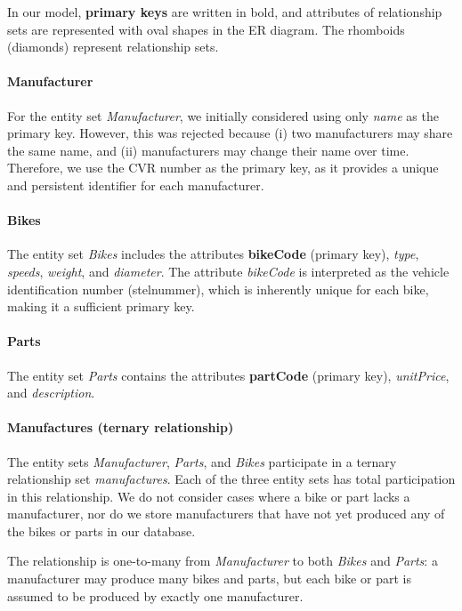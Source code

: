 \documentclass[dtu]{dtuarticle}
\begin{document}
In our model, \textbf{primary keys} are written in bold, and attributes of relationship sets are represented with oval shapes in the ER diagram. The rhomboids (diamonds) represent relationship sets.

\paragraph{Manufacturer}
For the entity set \textit{Manufacturer}, we initially considered using only \textit{name} as the primary key. However, this was rejected because (i) two manufacturers may share the same name, and (ii) manufacturers may change their name over time. Therefore, we use the CVR number as the primary key, as it provides a unique and persistent identifier for each manufacturer.

\paragraph{Bikes}
The entity set \textit{Bikes} includes the attributes \textbf{bikeCode} (primary key), \textit{type}, \textit{speeds}, \textit{weight}, and \textit{diameter}. The attribute \textit{bikeCode} is interpreted as the vehicle identification number (stelnummer), which is inherently unique for each bike, making it a sufficient primary key.

\paragraph{Parts}
The entity set \textit{Parts} contains the attributes \textbf{partCode} (primary key), \textit{unitPrice}, and \textit{description}.

\paragraph{Manufactures (ternary relationship)}
The entity sets \textit{Manufacturer}, \textit{Parts}, and \textit{Bikes} participate in a ternary relationship set \textit{manufactures}. Each of the three entity sets has total participation in this relationship. We do not consider cases where a bike or part lacks a manufacturer, nor do we store manufacturers that have not yet produced any of the bikes or parts in our database.

The relationship is one-to-many from \textit{Manufacturer} to both \textit{Bikes} and \textit{Parts}: a manufacturer may produce many bikes and parts, but each bike or part is assumed to be produced by exactly one manufacturer.
\end{document}
